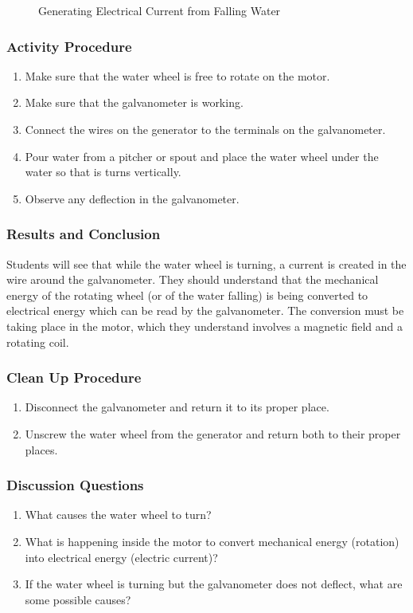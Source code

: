 \begin{figure}[h]
\begin{center}
\def\svgwidth{150pt}

\caption{Generating Electrical Current from Falling Water}
\label{fig:water-turbine}
\end{center}
\end{figure}

\subsubsection*{Activity Procedure}
\begin{enumerate}
\item{Make sure that the water wheel is free to rotate on the motor.} 
\item{Make sure that the galvanometer is working.} 
\item{Connect the wires on the generator to the terminals on the galvanometer.} 
\item{Pour water from a pitcher or spout and place the water wheel under the water so that is turns vertically.} 
\item{Observe any deflection in the galvanometer.} 
\end{enumerate}

\subsubsection*{Results and Conclusion}
Students will see that while the water wheel is turning, a current is created in the wire around the galvanometer. They should understand that the mechanical energy of the rotating wheel (or of the water falling) is being converted to electrical energy which can be read by the galvanometer. The conversion must be taking place in the motor, which they understand involves a magnetic field and a rotating coil.  

\subsubsection*{Clean Up Procedure}
\begin{enumerate}
\item{Disconnect the galvanometer and return it to its proper place.} 
\item{Unscrew the water wheel from the generator and return both to their proper places.} 
\end{enumerate}

\subsubsection*{Discussion Questions}
\begin{enumerate}
\item{What causes the water wheel to turn?}
\item{What is happening inside the motor to convert mechanical energy (rotation) into electrical energy (electric current)?}
\item{If the water wheel is turning but the galvanometer does not deflect, what are some possible causes?}
\end{enumerate}

